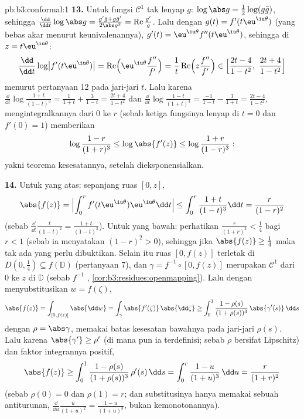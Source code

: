 \begin{solution}{pb:b3:conformal:1}
\textbf{13.} Untuk fungsi $\mathcal C^1$ tak lenyap $g$:
$\log\abs g = \frac12\log(g\bar g)$, sehingga $\frac{\dd}{\dd
t}\log\abs g = \frac{g'\bar g + g\bar g'}{2\abs g^2} =
\operatorname{Re}\frac{g'}g$. Lalu dengan $g(t) =
f'(t\eu^{\iu\theta})$ (yang bebas akar menurut keunivalenannya), $g'(t) =
\eu^{\iu\theta}f''(t\eu^{\iu\theta})$, sehingga di $z =
t\eu^{\iu\theta}$:
\[
\frac{\dd}{\dd t}\log\bigl|f'(t\eu^{\iu\theta})\bigr|
= \operatorname{Re}\Bigl(\eu^{\iu\theta}
\frac{f''}{f'}\Bigr)
= \frac1t\operatorname{Re}\Bigl(z\frac{f''}{f'}\Bigr)
\in \Bigl[\frac{2t - 4}{1 - t^2},\
\frac{2t + 4}{1 - t^2}\Bigr]
\]
menurut pertanyaan 12 pada jari-jari $t$. Lalu karena $\frac{\dd}{\dd
t}\log\frac{1+t}{(1-t)^3} = \frac1{1+t} + \frac3{1-t} =
\frac{2t+4}{1-t^2}$ dan $\frac{\dd}{\dd
t}\log\frac{1-t}{(1+t)^3} = \frac{-1}{1-t} - \frac3{1+t} =
\frac{2t-4}{1-t^2}$, mengintegralkannya dari $0$ ke $r$ (sebab ketiga
fungsinya lenyap di $t = 0$ dan $f'(0) = 1$) memberikan
\[
\log\frac{1-r}{(1+r)^3} \leq \log\abs{f'(z)} \leq
\log\frac{1+r}{(1-r)^3} :
\]
yakni teorema kesesatannya, setelah dieksponensialkan.

\textbf{14.} Untuk yang atas: sepanjang ruas $[0, z]$,
\[
\abs{f(z)} = \Bigl|\int_0^rf'(t\eu^{\iu\theta})
\eu^{\iu\theta}\dd t\Bigr|
\leq \int_0^r\frac{1+t}{(1-t)^3}\dd t
= \frac{r}{(1-r)^2}
\]
(sebab $\frac{\dd}{\dd t}\frac t{(1-t)^2} = \frac{1+t}{(1-t)^3}$).
Untuk yang bawah: perhatikan $\frac r{(1+r)^2} < \frac14$ bagi $r < 1$ (sebab ia
menyatakan $(1-r)^2 > 0$), sehingga jika $\abs{f(z)} \geq \frac14$ maka tak ada
yang perlu dibuktikan. Selain itu ruas $[0, f(z)]$ terletak
di $D(0, \frac14) \subseteq f(\mathbb D)$ (pertanyaan 7), dan
$\gamma = f^{-1}\circ[0, f(z)]$ merupakan  $\mathcal C^1$
dari $0$ ke $z$ di $\mathbb D$ (sebab $f^{-1}$ \omterm{def:b3:holomorphic:holo}{holomorfik},
\cref{cor:b3:residues:openmapping}). Lalu dengan menyubstitusikan $w =
f(\zeta)$,
\[
\abs{f(z)} = \int_{[0,f(z)]}\abs{\dd w}
= \int_\gamma\abs{f'(\zeta)}\,\abs{\dd\zeta}
\geq \int_0^1\frac{1 - \rho(s)}{(1 + \rho(s))^3}
\,\abs{\gamma'(s)}\,\dd s
\]
dengan $\rho = \abs\gamma$, memakai batas kesesatan bawahnya
pada jari-jari $\rho(s)$. Lalu karena $\abs{\gamma'} \geq \rho'$
(di mana pun ia terdefinisi; sebab $\rho$ bersifat Lipschitz) dan
faktor integrannya positif,
\[
\abs{f(z)} \geq \int_0^1
\frac{1 - \rho(s)}{(1 + \rho(s))^3}\,\rho'(s)\,\dd s
= \int_0^{r}\frac{1 - u}{(1 + u)^3}\,\dd u
= \frac{r}{(1 + r)^2}
\]
(sebab $\rho(0) = 0$ dan $\rho(1) = r$; dan substitusinya hanya memakai sebuah
antiturunan, $\frac{\dd}{\dd u}\frac u{(1+u)^2} =
\frac{1-u}{(1+u)^3}$, bukan kemonotonannya).


\end{solution}
